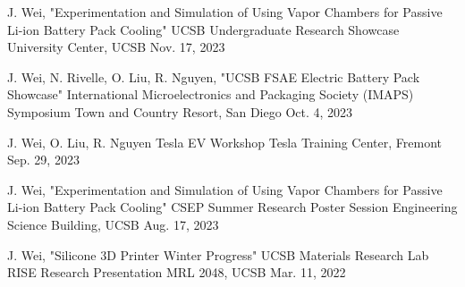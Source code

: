 


\begin{cventries}

\cventry
{J. Wei, "Experimentation and Simulation of Using Vapor Chambers for Passive Li-ion Battery Pack Cooling"} %
{UCSB Undergraduate Research Showcase} %
{University Center, UCSB} %
{Nov. 17, 2023} %
{ %
\begin{cvitems}
\end{cvitems}
}

\cventry
{J. Wei, N. Rivelle, O. Liu, R. Nguyen, "UCSB FSAE Electric Battery Pack Showcase"} %
{International Microelectronics and Packaging Society (IMAPS) Symposium} %
{Town and Country Resort, San Diego} %
{Oct. 4, 2023} %
{ %
\begin{cvitems}
\end{cvitems}
}


\cventry
{J. Wei, O. Liu, R. Nguyen} %
{Tesla EV Workshop} %
{Tesla Training Center, Fremont} %
{Sep. 29, 2023} %
{ %
\begin{cvitems}
\end{cvitems}
}


\cventry
{J. Wei, "Experimentation and Simulation of Using Vapor Chambers for Passive Li-ion Battery Pack Cooling"} %
{CSEP Summer Research Poster Session} %
{Engineering Science Building, UCSB} %
{Aug. 17, 2023} %
{ %
\begin{cvitems}
\end{cvitems}
}

\cventry
{J. Wei, "Silicone 3D Printer Winter Progress"} %
{UCSB Materials Research Lab RISE Research Presentation} %
{MRL 2048, UCSB} %
{Mar. 11, 2022} %
{ %
\begin{cvitems}
\end{cvitems}
}



\end{cventries}